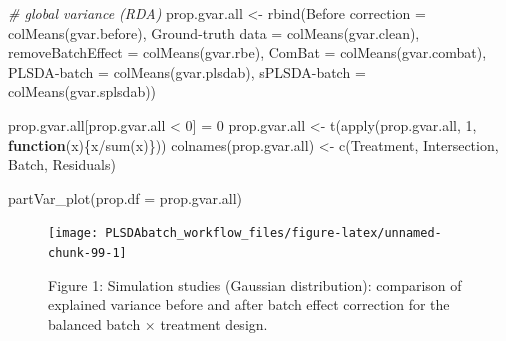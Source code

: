 \documentclass[
]{book}
\newenvironment{Shaded}{\begin{snugshade}}{\end{snugshade}}
\newcommand{\AttributeTok}[1]{\textcolor[rgb]{0.77,0.63,0.00}{#1}}
\newcommand{\CommentTok}[1]{\textcolor[rgb]{0.56,0.35,0.01}{\textit{#1}}}
\newcommand{\ControlFlowTok}[1]{\textcolor[rgb]{0.13,0.29,0.53}{\textbf{#1}}}
\newcommand{\DecValTok}[1]{\textcolor[rgb]{0.00,0.00,0.81}{#1}}
\newcommand{\FunctionTok}[1]{\textcolor[rgb]{0.00,0.00,0.00}{#1}}
\newcommand{\NormalTok}[1]{#1}
\newcommand{\OtherTok}[1]{\textcolor[rgb]{0.56,0.35,0.01}{#1}}
\newcommand{\SpecialCharTok}[1]{\textcolor[rgb]{0.00,0.00,0.00}{#1}}
\newcommand{\StringTok}[1]{\textcolor[rgb]{0.31,0.60,0.02}{#1}}
\begin{document}
\begin{Shaded}
\begin{Highlighting}[]
\CommentTok{\# global variance (RDA)}
\NormalTok{prop.gvar.all }\OtherTok{\textless{}{-}} \FunctionTok{rbind}\NormalTok{(}\StringTok{\textasciigrave{}}\AttributeTok{Before correction}\StringTok{\textasciigrave{}} \OtherTok{=} \FunctionTok{colMeans}\NormalTok{(gvar.before),}
                       \StringTok{\textasciigrave{}}\AttributeTok{Ground{-}truth data}\StringTok{\textasciigrave{}} \OtherTok{=} \FunctionTok{colMeans}\NormalTok{(gvar.clean),}
                       \AttributeTok{removeBatchEffect =} \FunctionTok{colMeans}\NormalTok{(gvar.rbe),}
                       \AttributeTok{ComBat =} \FunctionTok{colMeans}\NormalTok{(gvar.combat),}
                       \StringTok{\textasciigrave{}}\AttributeTok{PLSDA{-}batch}\StringTok{\textasciigrave{}} \OtherTok{=} \FunctionTok{colMeans}\NormalTok{(gvar.plsdab),}
                       \StringTok{\textasciigrave{}}\AttributeTok{sPLSDA{-}batch}\StringTok{\textasciigrave{}} \OtherTok{=} \FunctionTok{colMeans}\NormalTok{(gvar.splsdab))}

\NormalTok{prop.gvar.all[prop.gvar.all }\SpecialCharTok{\textless{}} \DecValTok{0}\NormalTok{] }\OtherTok{=} \DecValTok{0}
\NormalTok{prop.gvar.all }\OtherTok{\textless{}{-}} \FunctionTok{t}\NormalTok{(}\FunctionTok{apply}\NormalTok{(prop.gvar.all, }\DecValTok{1}\NormalTok{, }\ControlFlowTok{function}\NormalTok{(x)\{x}\SpecialCharTok{/}\FunctionTok{sum}\NormalTok{(x)\}))}
\FunctionTok{colnames}\NormalTok{(prop.gvar.all) }\OtherTok{\textless{}{-}} \FunctionTok{c}\NormalTok{(}\StringTok{\textquotesingle{}Treatment\textquotesingle{}}\NormalTok{, }\StringTok{\textquotesingle{}Intersection\textquotesingle{}}\NormalTok{, }\StringTok{\textquotesingle{}Batch\textquotesingle{}}\NormalTok{, }\StringTok{\textquotesingle{}Residuals\textquotesingle{}}\NormalTok{)}

\FunctionTok{partVar\_plot}\NormalTok{(}\AttributeTok{prop.df =}\NormalTok{ prop.gvar.all)}
\end{Highlighting}
\end{Shaded}

\begin{figure}

{\centering \texttt{[image: PLSDAbatch\_workflow\_files/figure-latex/unnamed-chunk-99-1]} 

}

\caption{Figure 1: Simulation studies (Gaussian distribution): comparison of explained variance before and after batch effect correction for the balanced batch × treatment design.}\label{fig:unnamed-chunk-99}
\end{figure}
\end{document}
